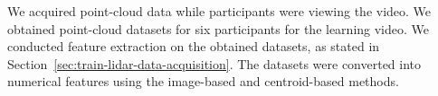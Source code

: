 \begin{deletedblock}
We acquired point-cloud data while participants were viewing the video. 
We obtained point-cloud datasets for six participants for the learning video.
We conducted feature extraction on the obtained datasets, as stated in Section~\ref{sec:train-lidar-data-acquisition}.
The datasets were converted into numerical features using the image-based and centroid-based methods.
\end{deletedblock}
